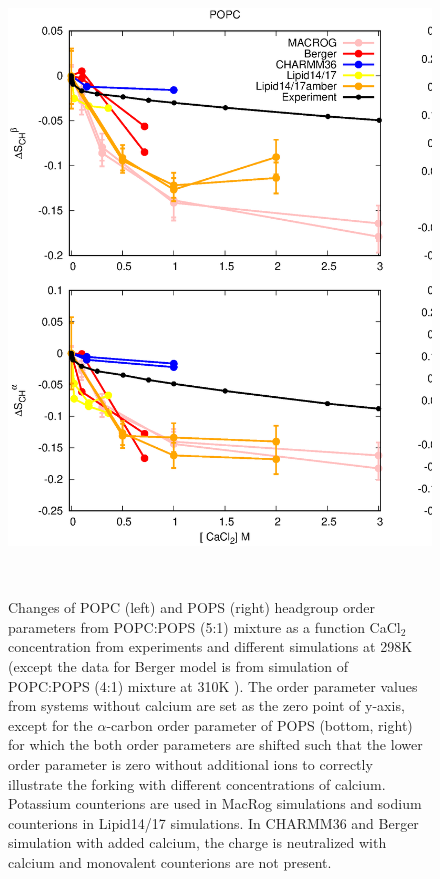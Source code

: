 \documentclass[aps,prl,superscriptaddress,twocolumn]{revtex4}
\begin{document}
\begin{figure}[]
  \centering
  \includegraphics[width=18cm]{../Figs/CHANGESwithCaClPS.eps}
  \caption{\label{changesWITHCaClPS}
    Changes of POPC (left) and POPS (right) headgroup order parameters from POPC:POPS (5:1) mixture
    as a function CaCl$_2$ concentration from experiments  and different simulations
    at 298K (except the data for Berger model is from simulation of POPC:POPS (4:1) mixture at 310K \cite{ollila07a,melcrova16}). 
    The order parameter values from systems without calcium are set as the zero point of y-axis,
    except for the $\alpha$-carbon order parameter of POPS (bottom, right) for which the both order parameters are shifted
    such that the lower order parameter is zero without additional ions to correctly illustrate
    the forking with different concentrations of calcium.
    Potassium counterions are used in MacRog simulations and sodium counterions in Lipid14/17 simulations.
    In CHARMM36 and Berger simulation with added calcium, the charge is neutralized with calcium and monovalent counterions are not present.
  }
   \\
\end{figure}
\end{document}
